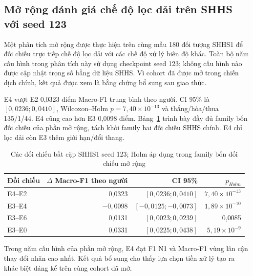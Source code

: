 \subsection{Mở rộng đánh giá chế độ lọc dải trên SHHS với seed 123}
\label{sec:shhs_seed123_extension}

Một phân tích mở rộng được thực hiện trên cùng mẫu 180 đối tượng SHHS1 để đối chiếu trực tiếp chế độ lọc dải với các chế độ xử lý biên độ khác. Toàn bộ năm cấu hình trong phân tích này sử dụng checkpoint seed 123; không cấu hình nào được cập nhật trọng số bằng dữ liệu SHHS. Vì cohort đã được mở trong chiến dịch chính, kết quả được xem là bằng chứng bổ sung sau giao thức.

\begin{table}[H]
\centering
\caption{Kết quả mô tả của phân tích mở rộng SHHS1}
\label{tab:shhs_seed123_extension}
\end{table}

E4 vượt E2 0,0323 điểm Macro-F1 trung bình theo người. CI 95\% là $[0,0236;0,0410]$, Wilcoxon--Holm $p=7,40\times10^{-13}$ và thắng/hòa/thua 135/1/44. E4 cũng cao hơn E3 0,0098 điểm. Bảng~\ref{tab:shhs_seed123_pairs} trình bày đầy đủ family bốn đối chiếu của phần mở rộng, tách khỏi family hai đối chiếu SHHS chính. E4 chỉ lọc dải còn E3 thêm giới hạn/đổi thang.

\begin{table}[H]
\centering
\caption{Các đối chiếu bắt cặp SHHS1 seed 123; Holm áp dụng trong family bốn đối chiếu mở rộng}
\label{tab:shhs_seed123_pairs}
\small
\begin{tabular}{lrrr}
\toprule
\textbf{Đối chiếu} & \textbf{$\Delta$ Macro-F1 theo người} & \textbf{CI 95\%} & \textbf{$p_{Holm}$} \\
\midrule
E4--E2 & 0,0323 & $[0,0236;0,0410]$ & $7,40\times10^{-13}$ \\
E3--E4 & $-0,0098$ & $[-0,0125;-0,0073]$ & $1,89\times10^{-10}$ \\
E3--E6 & 0,0131 & $[0,0023;0,0239]$ & 0,0085 \\
E3--E0 & 0,0331 & $[0,0225;0,0438]$ & $5,19\times10^{-9}$ \\
\bottomrule
\end{tabular}
\end{table}

Trong năm cấu hình của phần mở rộng, E4 đạt F1 N1 và Macro-F1 vùng lân cận thay đổi nhãn cao nhất. Kết quả bổ sung cho thấy lựa chọn tiền xử lý tạo ra khác biệt đáng kể trên cùng cohort đã mở.
